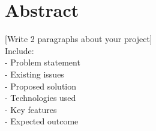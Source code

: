 \thispagestyle{plain}

\chapter*{Abstract}%
%

[Write 2 paragraphs about your project]\\
Include:\\
- Problem statement\\
-  Existing issues\\
- Proposed solution\\
- Technologies used\\
- Key features\\
- Expected outcome\\
\\
\thispagestyle{plain}
\newpage
